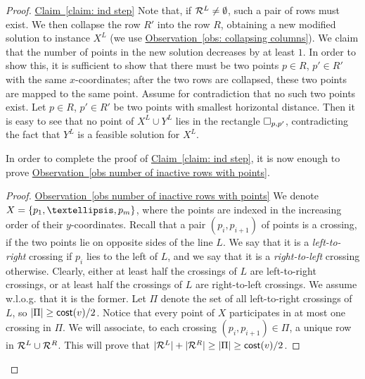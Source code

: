 \documentclass[11pt]{article}
\numberwithin{equation}{section}
\theoremstyle{definition}
\theoremstyle{plain}
\newcommand{\expref}[2]{\hyperref[#2]{#1~\ref{#2}}}
\begin{document}
\begin{proof}{\expref{Claim}{claim: ind step}}
Note that, if ${\mathcal R}^L\neq\emptyset$, such a pair of rows must exist. We then collapse the row $R'$ into the row $R$, obtaining a new modified solution to instance $X^L$ (we use \expref{Observation}{obs: collapsing columns}). We claim that the number of points in the new solution decreases by at least $1$. In order to show this, it is sufficient to show that there must be two points $p\in R$, $p'\in R'$ with the same $x$-coordinates; after the two rows are collapsed, these two points are mapped to the same point. Assume for contradiction that no such two points exist. Let $p\in R$, $p'\in R'$ be two points with smallest horizontal distance. Then it is easy to see that no point of $X^L\cup Y^L$ lies in the rectangle $\Box_{p,p'}$, contradicting the fact that $Y^L$ is a feasible solution for $X^L$.

In order to complete the proof of \expref{Claim}{claim: ind step}, it is now enough to prove \expref{Observation}{obs number of inactive rows with points}.

\begin{proof}{\expref{Observation}{obs number of inactive rows with points}}
We denote $X=\set{p_1,\ldots,p_m}$, where the points are indexed in the increasing order of their $y$-coordinates. Recall that a pair $(p_i,p_{i+1})$ of points is a crossing, if the two points lie on opposite sides of the line $L$. We say that it is a \emph{left-to-right} crossing if $p_i$ lies to the left of $L$, and we say that it is a \emph{right-to-left} crossing otherwise. Clearly, either at least half the crossings of $L$ are left-to-right crossings, or at least half the crossings of $L$ are right-to-left crossings. We assume w.l.o.g. that it is the former. Let $\Pi$ denote the set of all left-to-right crossings of $L$, so $|\Pi|\geq \mathsf{cost}(v)/2$. Notice that every point of $X$ participates in at most one crossing in $\Pi$. We will associate, to each crossing $(p_i,p_{i+1})\in \Pi$, a unique row in ${\mathcal R}^L\cup {\mathcal R}^R$. This will prove that $|{\mathcal R}^L|+|{\mathcal R}^R|\geq |\Pi|\geq \mathsf{cost}(v)/2$.


\end{proof}
\end{proof}
\end{document}
